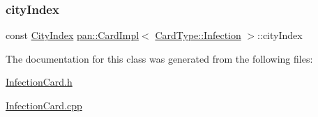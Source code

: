 \subsubsection{\texorpdfstring{city\+Index}{cityIndex}}
{\footnotesize\ttfamily const \hyperlink{namespacepan_afaed28aa6603153dcc062a028602d697}{City\+Index} \hyperlink{classpan_1_1_card_impl}{pan\+::\+Card\+Impl}$<$ \hyperlink{namespacepan_a1f7350bfd0421afeabe9fa95c16fa811af0ddc0838281faf6d55e2cf840a2a8ef}{Card\+Type\+::\+Infection} $>$\+::city\+Index}



The documentation for this class was generated from the following files\+:\begin{DoxyCompactItemize}
\item 
\hyperlink{_infection_card_8h}{Infection\+Card.\+h}\item 
\hyperlink{_infection_card_8cpp}{Infection\+Card.\+cpp}\end{DoxyCompactItemize}

